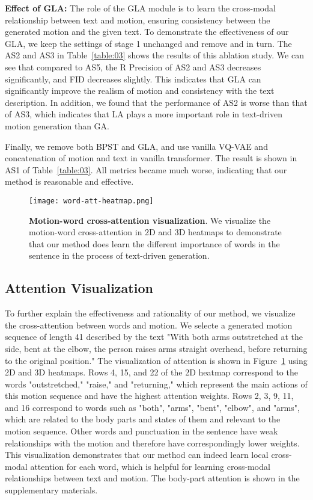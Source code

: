 \documentclass[10pt,twocolumn,letterpaper]{article}
\begin{document}
\textbf{Effect of GLA:}
The role of the GLA module is to learn the cross-modal relationship between text and motion, ensuring consistency between the generated motion and the given text. To demonstrate the effectiveness of our GLA, we keep the settings of stage 1 unchanged and remove  and  in turn. The AS2 and AS3 in Table~\ref{table:03} shows the results of this ablation study. We can see that compared to AS5, the R Precision of AS2 and AS3 decreases significantly, and FID decreases slightly. This indicates that GLA can significantly improve the realism of motion and consistency with the text description. In addition, we found that the performance of AS2 is worse than that of AS3, which indicates that LA plays a more important role in text-driven motion generation than GA.

Finally, we remove both BPST and GLA, and use vanilla VQ-VAE and concatenation of motion and text in vanilla transformer. The result is shown in AS1 of Table~\ref{table:03}. All metrics became much worse, indicating that our method is reasonable and effective.


\begin{figure}[t]
    \centering
    \texttt{[image: word-att-heatmap.png]}
    \caption{\textbf{Motion-word cross-attention visualization}. We visualize the motion-word cross-attention in 2D and 3D heatmaps to demonstrate that our method does learn the different importance of words in the sentence in the process of text-driven generation.}
    \label{img:07}
\end{figure}

\subsection{Attention Visualization}\label{ssec:att}

To further explain the effectiveness and rationality of our method, we visualize the cross-attention between words and motion. We selecte a generated motion sequence of length 41 described by the text "With both arms outstretched at the side, bent at the elbow, the person raises arms straight overhead, before returning to the original position." The visualization of attention is shown in Figure~\ref{img:07} using 2D and 3D heatmaps. Rows 4, 15, and 22 of the 2D heatmap correspond to the words "outstretched," "raise," and "returning," which represent the main actions of this motion sequence and have the highest attention weights. Rows 2, 3, 9, 11, and 16 correspond to words such as "both", "arms", "bent", "elbow", and "arms", which are related to the body parts and states of them and relevant to the motion sequence. Other words and punctuation in the sentence have weak relationships with the motion and therefore have correspondingly lower weights. This visualization demonstrates that our method can indeed learn local cross-modal attention for each word, which is helpful for learning cross-modal relationships between text and motion. The body-part attention is shown in the supplementary materials.
\end{document}
